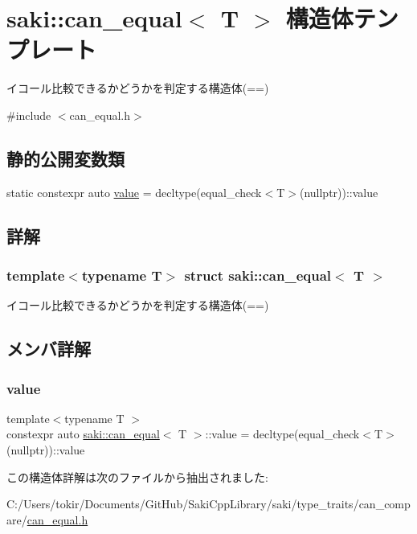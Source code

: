 \hypertarget{structsaki_1_1can__equal}{}\section{saki\+:\+:can\+\_\+equal$<$ T $>$ 構造体テンプレート}
\label{structsaki_1_1can__equal}


イコール比較できるかどうかを判定する構造体(==)  




{\ttfamily \#include $<$can\+\_\+equal.\+h$>$}

\subsection*{静的公開変数類}
\begin{DoxyCompactItemize}
\item 
static constexpr auto \mbox{\hyperlink{structsaki_1_1can__equal_a04b5d5b92935fd62f24dde65435d3b97}{value}} = decltype(equal\+\_\+check$<$T$>$(nullptr))\+::value
\end{DoxyCompactItemize}


\subsection{詳解}
\subsubsection*{template$<$typename T$>$\newline
struct saki\+::can\+\_\+equal$<$ T $>$}

イコール比較できるかどうかを判定する構造体(==) 

\subsection{メンバ詳解}
\mbox{\label{structsaki_1_1can__equal_a04b5d5b92935fd62f24dde65435d3b97}} 
\subsubsection{\texorpdfstring{value}{value}}
{\footnotesize\ttfamily template$<$typename T $>$ \\
constexpr auto \mbox{\hyperlink{structsaki_1_1can__equal}{saki\+::can\+\_\+equal}}$<$ T $>$\+::value = decltype(equal\+\_\+check$<$T$>$(nullptr))\+::value\hspace{0.3cm}{\ttfamily [static]}}



この構造体詳解は次のファイルから抽出されました\+:\begin{DoxyCompactItemize}
\item 
C\+:/\+Users/tokir/\+Documents/\+Git\+Hub/\+Saki\+Cpp\+Library/saki/type\+\_\+traits/can\+\_\+compare/\mbox{\hyperlink{can__equal_8h}{can\+\_\+equal.\+h}}\end{DoxyCompactItemize}
